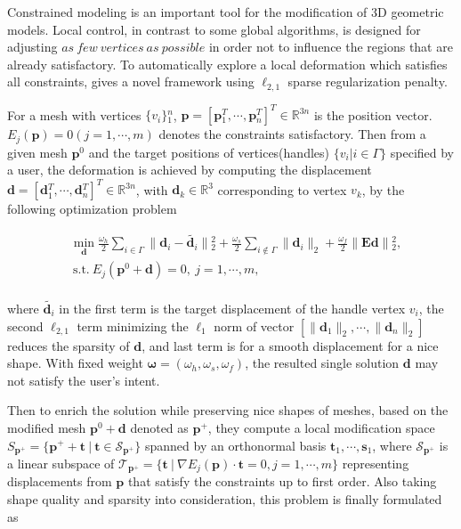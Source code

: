 Constrained modeling is an important tool for the modification of 3D geometric models.
Local control, in contrast to some global algorithms, is designed for adjusting $as~ few~ vertices~ as~ possible$ in order not to influence the regions that are already satisfactory.
To automatically explore a local deformation which satisfies all constraints, \cite{deng2013exploring} gives a novel framework using $\ell_{2,1}$ sparse regularization penalty.

For a mesh with vertices $\{v_{i}\}{_{1}^{n}}$,
$\mathbf{p}=[\mathbf{p}{_{1}^{T}},\cdots, \mathbf{p}{_{n}^{T}}]^{T}\in \mathbb{R}^{3n}$ is the position vector.
$E_{j}(\mathbf{p})=0(j=1,\cdots,m)$ denotes the constraints satisfactory.
Then from a given mesh $\mathbf{p}^0$ and the target positions of vertices(handles) $\{v_{i}|i\in\Gamma\}$ specified by a user,
the deformation is achieved by computing the displacement
$\mathbf{d}=[\mathbf{d}{_{1}^{T}},\cdots, \mathbf{d}{_{n}^{T}}]^{T}\in \mathbb{R}^{3n}$, with
$\mathbf{d}_{k}\in\mathbb{R}^3$ corresponding to vertex $v_{k}$,
by the following optimization problem

\small{
\begin{equation}
 \label{eq:localmodeling1}
 \begin{split}
 & \min_{\mathbf{d}}  \frac{\omega_{h}}{2} \sum_{i\in\Gamma}^{} \| \mathbf{d}_{i}- \widetilde{\mathbf{d}_{i}} \|{_2^2}
                      +\frac{\omega_{s}}{2} \sum_{i\notin\Gamma}^{} \| \mathbf{d}_{i} \|_2
                      +\frac{\omega_{f}}{2} \| \mathbf{Ed} \|{_2^2},\\
 & ~\textrm{s.t.}~ E_{j}(\mathbf{p}^0+\mathbf{d})=0,~j=1,\cdots,m,
 \end{split}
\end{equation}
}
\\
where $\widetilde{\mathbf{d}_{i}}$ in the first term is the target displacement of the handle vertex $v_{i}$,
the second $\ell_{2,1}$ term minimizing the $\ell_1$ norm of vector $[\|\mathbf{d}_1\|_2,\cdots,\|\mathbf{d}_n\|_2]$ reduces the sparsity of $\mathbf{d}$,
and last term is for a smooth displacement for a nice shape.
With fixed weight $\mathbf{\omega}=(\omega_{h},\omega_{s},\omega_{f})$, the resulted single solution $\mathbf{d}$ may not satisfy the user's intent.

Then to enrich the solution while preserving nice shapes of meshes,
based on the modified mesh $\mathbf{p}^0+\mathbf{d}$ denoted as $\mathbf{p}^{+}$,
they compute a local modification space
$S_{\mathbf{p}^{+}}=\{ \mathbf{p}^{+}+\mathbf{t}~|~\mathbf{t}\in \mathcal{S}_{\mathbf{p}^{+}} \}$ spanned by an orthonormal basis $\mathbf{t}_1,\cdots,\mathbf{s}_1$,
where $\mathcal{S}_{\mathbf{p}^{+}}$ is a linear subspace of
$\mathcal{T}_{\mathbf{p}^{+}}=\{ \mathbf{t}~|~\nabla E_{j}(\mathbf{p})\cdot \mathbf{t}=0,j=1,\cdots,m \}$
representing displacements from $\mathbf{p}$ that satisfy the constraints up to first order.
Also taking shape quality and sparsity into consideration, this problem is finally formulated as

